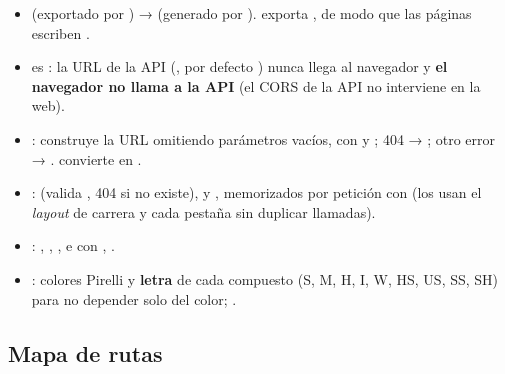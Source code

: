 \begin{itemize}
\item {} (exportado por ) →  (generado por ).  exporta , de modo que las páginas escriben .
\item {} es : la URL de la API (, por defecto ) nunca llega al navegador y \textbf{el navegador no llama a la API} (el CORS de la API no interviene en la web).
\item {}: construye la URL omitiendo parámetros vacíos,  con  y ; 404 → ; otro error → .  convierte  en .
\item {}:  (valida , 404 si no existe),  y , memorizados por petición con  (los usan el \emph{layout} de carrera y cada pestaña sin duplicar llamadas).
\item {}: , , ,  e  con , .
\item {}: colores Pirelli y \textbf{letra} de cada compuesto (S, M, H, I, W, HS, US, SS, SH) para no depender solo del color; .
\end{itemize}

\subsection{Mapa de rutas}

